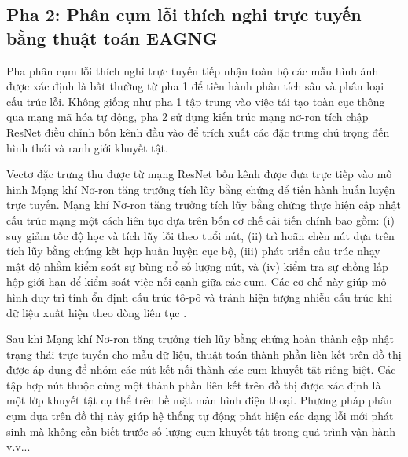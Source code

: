 \subsection{Pha 2: Phân cụm lỗi thích nghi trực tuyến bằng thuật toán EAGNG}
\label{subsec:pha2_overview}

Pha phân cụm lỗi thích nghi trực tuyến tiếp nhận toàn bộ các mẫu hình ảnh được xác định là bất thường từ pha 1 để tiến hành phân tích sâu và phân loại cấu trúc lỗi. Không giống như pha 1 tập trung vào việc tái tạo toàn cục thông qua mạng mã hóa tự động, pha 2 sử dụng kiến trúc mạng nơ-ron tích chập ResNet điều chỉnh bốn kênh đầu vào để trích xuất các đặc trưng chú trọng đến hình thái và ranh giới khuyết tật.

Vectơ đặc trưng thu được từ mạng ResNet bốn kênh được đưa trực tiếp vào mô hình Mạng khí Nơ-ron tăng trưởng tích lũy bằng chứng để tiến hành huấn luyện trực tuyến. Mạng khí Nơ-ron tăng trưởng tích lũy bằng chứng thực hiện cập nhật cấu trúc mạng một cách liên tục dựa trên bốn cơ chế cải tiến chính bao gồm: (i) suy giảm tốc độ học và tích lũy lỗi theo tuổi nút, (ii) trì hoãn chèn nút dựa trên tích lũy bằng chứng kết hợp huấn luyện cục bộ, (iii) phát triển cấu trúc nhạy mật độ nhằm kiểm soát sự bùng nổ số lượng nút, và (iv) kiểm tra sự chồng lấp hộp giới hạn để kiểm soát việc nối cạnh giữa các cụm. Các cơ chế này giúp mô hình duy trì tính ổn định cấu trúc tô-pô và tránh hiện tượng nhiễu cấu trúc khi dữ liệu xuất hiện theo dòng liên tục \cite{fritzke1995growing}.

Sau khi Mạng khí Nơ-ron tăng trưởng tích lũy bằng chứng hoàn thành cập nhật trạng thái trực tuyến cho mẫu dữ liệu, thuật toán thành phần liên kết trên đồ thị được áp dụng để nhóm các nút kết nối thành các cụm khuyết tật riêng biệt. Các tập hợp nút thuộc cùng một thành phần liên kết trên đồ thị được xác định là một lớp khuyết tật cụ thể trên bề mặt màn hình điện thoại. Phương pháp phân cụm dựa trên đồ thị này giúp hệ thống tự động phát hiện các dạng lỗi mới phát sinh mà không cần biết trước số lượng cụm khuyết tật trong quá trình vận hành v.v...